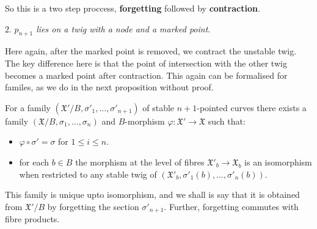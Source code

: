 So this is a two step proccess, \textbf{forgetting} followed by \textbf{contraction}. 
\par $2.$ \textit{$p_{n+1}$ lies on a twig with a node and a marked point}.
\begin{center}
\end{center}
\par Here again, after the marked point is removed, we contract the unstable twig.
The key difference here is that the point of intersection with the other twig becomes a marked point after contraction.
This again can be formalised for familes, as we do in the next proposition without proof.
\begin{proposition}
    For a family $(\mathfrak{X}'/B, \sigma'_{1},\dots, \sigma'_{n+1})$ of stable $n+1$-pointed curves there exists a family $(\mathfrak{X}/B, \sigma_{1},\dots, \sigma_{n})$ and $B$-morphism $\varphi: \mathfrak{X}' \to \mathfrak{X}$ such that:
    \begin{itemize}
        \item $\varphi \circ \sigma' = \sigma$ for $1\leq i \leq n$.
        \item for each $b \in B$ the morphism at the level of fibres $\mathfrak{X}'_{b}\to \mathfrak{X}_{b}$ is an isomorphism when restricted to any stable twig of $(\mathfrak{X}'_{b}, \sigma'_{1}(b), \dots, \sigma'_{n}(b))$.
    \end{itemize}
    This family is unique upto isomorphism, and we shall is say that it is obtained from $\mathfrak{X}'/B$ by forgetting the section $\sigma'_{n+1}$. Further, forgetting commutes with fibre products.
\end{proposition}

